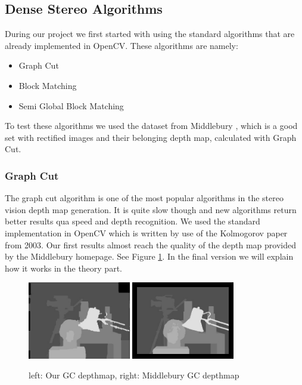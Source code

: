 \documentclass[a4paper]{article}
\begin{document}
\subsection{Dense Stereo Algorithms}
During our project we first started with using the standard algorithms
that are already implemented in OpenCV. These algorithms are namely:
\begin{itemize}
\item Graph Cut
\item Block Matching
\item Semi Global Block Matching
\end{itemize}
To test these algorithms we used the dataset from Middlebury
\cite{middlebury}, which is a good set with rectified images and their
belonging depth map, calculated with Graph Cut.

\subsubsection{Graph Cut}
The graph cut algorithm is one of the most popular algorithms in the
stereo vision depth map generation. It is quite slow though and new
algorithms return better results qua speed and depth recognition. We
used the standard implementation in OpenCV which is written by use of
the Kolmogorov paper from 2003\cite{kolmogorov2003}. Our first results
almost reach the quality of the depth map provided by the Middlebury
homepage\cite{middlebury}. See Figure \ref{gc_comp}. In the final
version we will explain how it works in the theory part. %

\begin{figure} [h!tb]
  \centering
  \includegraphics[width=0.4\textwidth]{gc_tsukuba_own}
  \includegraphics[width=0.4\textwidth]{disp_tsukuba_orig}
  \caption{left: Our GC depthmap, right: Middlebury GC depthmap}
  \label{gc_comp}
\end{figure}
\end{document}
